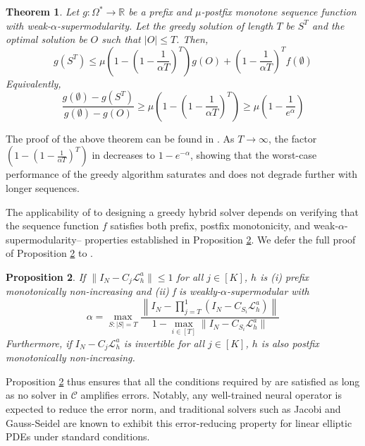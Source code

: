 \documentclass{article} %
\newtheorem{theorem}{Theorem}[section]
\newtheorem{proposition}[theorem]{Proposition}
\begin{document}
\begin{theorem} \label{th:suboptgreedy}
    Let $g: \Omega^* \to \mathbb{R}$ be a prefix and $\mu$-postfix monotone sequence function with weak-$\alpha$-supermodularity. Let the greedy solution of length $T$ be $S^T$ and the optimal solution be $O$ such that $|O| \leq T$. Then,
    \begin{equation*}
        g(S^T) \leq  \mu\left(1 - \left(1 - \frac{1}{\alpha T}\right)^T\right)
        g(O) +  \left(1 - \frac{1}{\alpha T}\right)^Tf(\emptyset)
    \end{equation*}
    Equivalently, 
    \begin{equation*}
        \frac{g(\emptyset) - g(S^T)}{g(\emptyset) - g(O)} \geq \mu\left(1 - \left(1 - \frac{1}{\alpha T}\right)^T\right) \geq \mu\left(1 - \frac{1}{e^{\alpha}}\right)
    \end{equation*}
\end{theorem}

The proof of the above theorem can be found in . As $T \to \infty$, the factor $\left(1 - \left(1 - \frac{1}{\alpha T}\right)^T\right)$ in  decreases to $1 - e^{-\alpha}$, showing that the worst-case performance of the greedy algorithm saturates and does not degrade further with longer sequences. 

The applicability of  to designing a greedy hybrid solver depends on verifying that the sequence function $f$ satisfies both prefix, postfix monotonicity, and weak-$\alpha$-supermodularity-- properties established in Proposition \ref{th:weaklyalphasupermodular}. We defer the full proof of Proposition \ref{th:weaklyalphasupermodular} to .

\begin{proposition} \label{th:weaklyalphasupermodular}
    If $\|I_N - C_j\mathcal{L}_h^a\| \leq 1$ for all $j \in [K]$, $h$ is (i) prefix monotonically non-increasing and (ii) f is weakly-$\alpha$-supermodular with $$\alpha = \max_{S: |S| = T}\frac{\left\|I_N - \prod_{j = T}^{1}\left(I_N - C_{S_i}\mathcal{L}_h^a\right)\right\|}{1 - \max_{i \in [T]}\|I_N - C_{S_i}\mathcal{L}_h^a\| }$$Furthermore, if $I_N - C_j\mathcal{L}_h^a$ is invertible for all $j \in [K]$, $h$ is also postfix monotonically non-increasing.
\end{proposition}

Proposition \ref{th:weaklyalphasupermodular} thus ensures that all the conditions required by  are satisfied as long as no solver in $\mathcal{C}$ amplifies errors. Notably, any well-trained neural operator is expected to reduce the error norm, and traditional solvers such as Jacobi and Gauss-Seidel are known to exhibit this error-reducing property for linear elliptic PDEs under standard conditions. 
\end{document}
